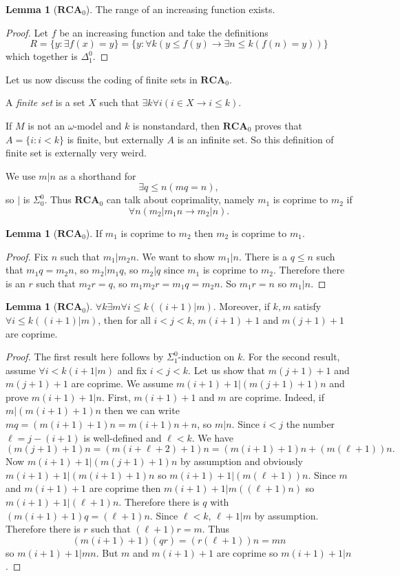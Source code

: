 \documentclass[12pt]{book}
\newcommand{\RCA}{\mathbf{RCA}}
\newcommand{\dfn}[1]{\emph{#1}\index{#1}}
\theoremstyle{definition}
\newtheorem{lemma}[theorem]{Lemma}
\newenvironment{definition}
  {\pushQED{\qed}\renewcommand{\qedsymbol}{$\diamondsuit$}\definitionx}
  {\popQED\endexamplex}
\begin{document}
\begin{lemma}[$\RCA_0$]
The range of an increasing function exists.
\end{lemma}
\begin{proof}
Let $f$ be an increasing function and take the definitions
$$R = \{y: \exists f(x) = y\} = \{y: \forall k(y \leq f(y) \to \exists n \leq k(f(n) = y))\}$$
which together is $\Delta_1^0$.
\end{proof}

Let us now discuss the coding of finite sets in $\RCA_0$.

\begin{definition}[$\RCA_0$]
A \dfn{finite set} is a set $X$ such that $\exists k \forall i(i \in X \to i \leq k)$.
\end{definition}

If $M$ is not an $\omega$-model and $k$ is nonstandard, then $\RCA_0$ proves that $A = \{i: i < k\}$ is finite, but externally $A$ is an infinite set.
So this definition of finite set is externally very weird.

We use $m|n$ as a shorthand for
$$\exists q \leq n(mq = n),$$
so $|$ is $\Sigma_0^0$. Thus $\RCA_0$ can talk about coprimality, namely $m_1$ is coprime to $m_2$ if
$$\forall n(m_2|m_1n \to m_2|n).$$
\begin{lemma}[$\RCA_0$]
If $m_1$ is coprime to $m_2$ then $m_2$ is coprime to $m_1$.
\end{lemma}
\begin{proof}
Fix $n$ such that $m_1|m_2n$. We want to show $m_1|n$.
There is a $q \leq n$ such that $m_1q = m_2n$, so $m_2|m_1q$, so $m_2|q$ since $m_1$ is coprime to $m_2$.
Therefore there is an $r$ such that $m_2r = q$, so $m_1m_2r = m_1q = m_2n$.
So $m_1r = n$ so $m_1|n$.
\end{proof}

\begin{lemma}[$\RCA_0$]
$\forall k \exists m \forall i \leq k((i+1)|m)$. Moreover, if $k,m$ satisfy $\forall i \leq k((i+1)|m)$, then for all $i < j < k$, $m(i+1)+1$ and $m(j+1)+1$ are coprime.
\end{lemma}
\begin{proof}
The first result here follows by $\Sigma_1^0$-induction on $k$.
For the second result, assume $\forall i < k(i+1|m)$ and fix $i < j < k$.
Let us show that $m(j+1)+1$ and $m(j+1)+1$ are coprime.
We assume $m(i+1)+1|(m(j+1)+1)n$ and prove $m(i+1)+1|n$.
First, $m(i+1)+1$ and $m$ are coprime. Indeed, if $m|(m(i+1)+1)n$ then we can write $mq = (m(i+1)+1)n = m(i+1)n + n$, so $m|n$.
Since $i < j$ the number $\ell = j - (i + 1)$ is well-defined and $\ell < k$.
We have
$$(m(j+1)+1)n = (m(i+\ell+2)+1)n = (m(i+1)+1)n + (m(\ell + 1))n.$$
Now $m(i+1)+1|(m(j+1)+1)n$ by assumption and obviously $m(i+1)+1|(m(i+1)+1)n$ so $m(i+1)+1|(m(\ell + 1))n$.
Since $m$ and $m(i+1)+1$ are coprime then $m(i+1)+1|m((\ell + 1)n)$ so $m(i+1)+1|(\ell + 1)n$.
Therefore there is $q$ with $(m(i+1)+1)q = (\ell + 1)n$.
Since $\ell < k$, $\ell + 1|m$ by assumption.
Therefore there is $r$ such that $(\ell + 1)r = m$.
Thus
$$(m(i+1)+1)(qr) = (r(\ell + 1))n = mn$$
so $m(i+1)+1|mn$. But $m$ and $m(i+1)+1$ are coprime so $m(i+1)+1|n$.
\end{proof}
\end{document}

